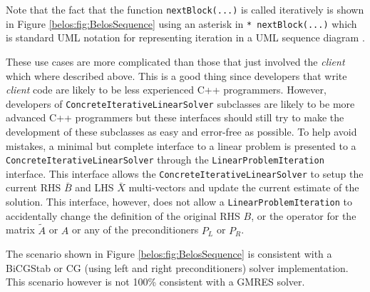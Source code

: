 \documentclass[pdf,ps2pdf,11pt]{SANDreport}
\begin{document}
Note that the fact that the function {}\texttt{nextBlock(...)} is
called iteratively is shown in Figure {}\ref{belos:fig:BelosSequence}
using an asterisk in {}\texttt{* nextBlock(...)} which is standard UML
notation for representing iteration in a UML sequence diagram
{}\cite{ref:uml_distilled_2nd_ed}.

These use cases are more complicated than those that just involved the
{}\textit{client} which where described above.  This is a good thing
since developers that write {}\textit{client} code are likely to be
less experienced C++ programmers.  However, developers of
{}\texttt{Concrete\-Iterative\-Linear\-Solver} subclasses are likely to
be more advanced C++ programmers but these interfaces should still try
to make the development of these subclasses as easy and error-free as
possible.  To help avoid mistakes, a minimal but complete interface to
a linear problem is presented to a
{}\texttt{Concrete\-Iterative\-Linear\-Solver} through the
{}\texttt{Linear\-Problem\-Iteration} interface.  This interface
allows the {}\texttt{Concrete\-Iterative\-Linear\-Solver} to setup the
current RHS $\bar{B}$ and LHS $\bar{X}$ multi-vectors and update the
current estimate of the solution.  This interface, however, does not
allow a {}\texttt{Linear\-Problem\-Iteration} to accidentally change
the definition of the original RHS $B$, or the operator for the matrix
$\tilde{A}$ or $A$ or any of the preconditioners $P_L$ or $P_R$.

The scenario shown in Figure {}\ref{belos:fig:BelosSequence} is
consistent with a BiCGStab or CG (using left and right
preconditioners) solver implementation.  This scenario however is not
100\% consistent with a GMRES solver.
\end{document}
